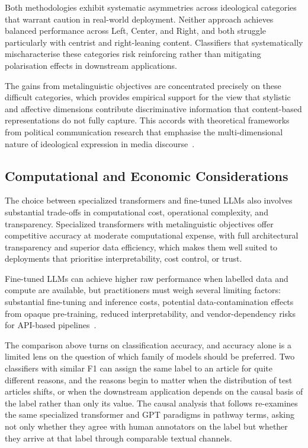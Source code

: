 Both methodologies exhibit systematic asymmetries across ideological categories that warrant caution in real-world deployment. Neither approach achieves balanced performance across Left, Center, and Right, and both struggle particularly with centrist and right-leaning content. Classifiers that systematically mischaracterise these categories risk reinforcing rather than mitigating polarisation effects in downstream applications.

The gains from metalinguistic objectives are concentrated precisely on these difficult categories, which provides empirical support for the view that stylistic and affective dimensions contribute discriminative information that content-based representations do not fully capture. This accords with theoretical frameworks from political communication research that emphasise the multi-dimensional nature of ideological expression in media discourse~\citep{hamborg2019automatedmediabias}.

\subsection{Computational and Economic Considerations}

The choice between specialized transformers and fine-tuned LLMs also involves substantial trade-offs in computational cost, operational complexity, and transparency. Specialized transformers with metalinguistic objectives offer competitive accuracy at moderate computational expense, with full architectural transparency and superior data efficiency, which makes them well suited to deployments that prioritise interpretability, cost control, or trust.

Fine-tuned LLMs can achieve higher raw performance when labelled data and compute are available, but practitioners must weigh several limiting factors: substantial fine-tuning and inference costs, potential data-contamination effects from opaque pre-training, reduced interpretability, and vendor-dependency risks for API-based pipelines~\citep{Wen_2023}.

The comparison above turns on classification accuracy, and accuracy alone is a limited lens on the question of which family of models should be preferred. Two classifiers with similar F1 can assign the same label to an article for quite different reasons, and the reasons begin to matter when the distribution of test articles shifts, or when the downstream application depends on the causal basis of the label rather than only its value. The causal analysis that follows re-examines the same specialized transformer and GPT paradigms in pathway terms, asking not only whether they agree with human annotators on the label but whether they arrive at that label through comparable textual channels.
